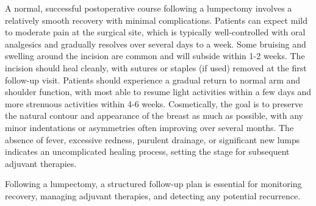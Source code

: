 A normal, successful postoperative course following a lumpectomy involves a relatively smooth recovery with minimal complications. Patients can expect mild to moderate pain at the surgical site, which is typically well-controlled with oral analgesics and gradually resolves over several days to a week. Some bruising and swelling around the incision are common and will subside within 1-2 weeks. The incision should heal cleanly, with sutures or staples (if used) removed at the first follow-up visit. Patients should experience a gradual return to normal arm and shoulder function, with most able to resume light activities within a few days and more strenuous activities within 4-6 weeks. Cosmetically, the goal is to preserve the natural contour and appearance of the breast as much as possible, with any minor indentations or asymmetries often improving over several months. The absence of fever, excessive redness, purulent drainage, or significant new lumps indicates an uncomplicated healing process, setting the stage for subsequent adjuvant therapies.

Following a lumpectomy, a structured follow-up plan is essential for monitoring recovery, managing adjuvant therapies, and detecting any potential recurrence.


